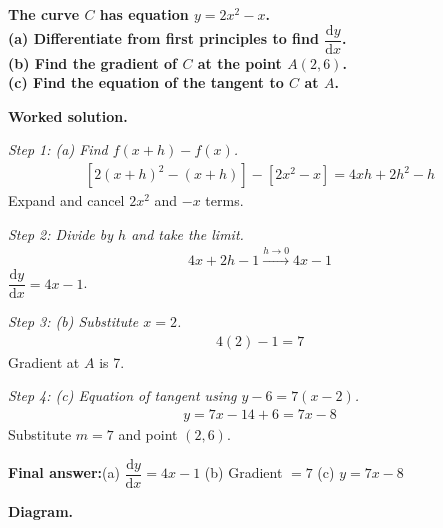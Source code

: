 \documentclass[11pt]{article}
\newcommand{\question}[1]{\par\medskip\noindent\textbf{#1}\par}
\begin{document}
\question{The curve \( C \) has equation \( y = 2x^2 - x \).\\[3pt]  (a) Differentiate from first principles to find \( \dfrac{\mathrm{d}y}{\mathrm{d}x} \).\\[3pt]  (b) Find the gradient of \( C \) at the point \( A(2, 6) \).\\[3pt]  (c) Find the equation of the tangent to \( C \) at \( A \).}

\textbf{Worked solution.}

\textit{Step 1: (a) Find \( f(x+h) - f(x) \).}
\[\begin{gathered}
[2(x+h)^2 - (x+h)] - [2x^2 - x] = 4xh + 2h^2 - h
\end{gathered}\]
Expand and cancel \( 2x^2 \) and \( -x \) terms.

\textit{Step 2: Divide by \( h \) and take the limit.}
\[\begin{gathered}
4x + 2h - 1 \xrightarrow{h \to 0} 4x - 1
\end{gathered}\]
\( \dfrac{\mathrm{d}y}{\mathrm{d}x} = 4x - 1 \).

\textit{Step 3: (b) Substitute \( x = 2 \).}
\[\begin{gathered}
4(2) - 1 = 7
\end{gathered}\]
Gradient at \( A \) is 7.

\textit{Step 4: (c) Equation of tangent using \( y - 6 = 7(x - 2) \).}
\[\begin{gathered}
y = 7x - 14 + 6 = 7x - 8
\end{gathered}\]
Substitute \( m = 7 \) and point \( (2, 6) \).

\begin{answerbox}
\textbf{Final answer:}\quad (a) \(\displaystyle  \dfrac{\mathrm{d}y}{\mathrm{d}x} = 4x - 1 \) \quad  (b) Gradient \(\displaystyle  = 7 \) \quad  (c) \(\displaystyle  y = 7x - 8 \)
\end{answerbox}
\textbf{Diagram.}
\end{document}
